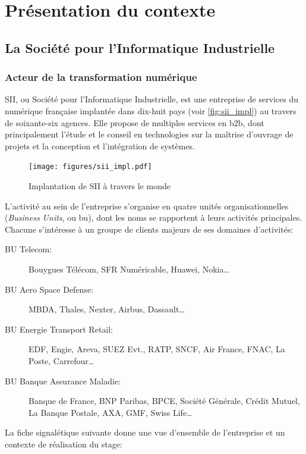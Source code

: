 \chapter{Présentation du contexte}
{
	\section{La Société pour l'Informatique Industrielle}
	{
		\subsection{Acteur de la transformation numérique}
		{
			\par
			{
				SII, ou Société pour l'Informatique Industrielle, est une entreprise de services du numérique française implantée dans dix-huit pays (voir \autoref{fig:sii_impl}) au travers de soixante-six agences. Elle propose de multiples services en \gls{b2b}, dont principalement l'étude et le conseil en technologies sur la maîtrise d'ouvrage de projets et la conception et l'intégration de systèmes.
			}
			
			\begin{figure}[h]
			{
				\centering
				\texttt{[image: figures/sii\_impl.pdf]}
				\caption{Implantation de SII à travers le monde\cite{sii_rf}}
				\label{fig:sii_impl}
			}
			\end{figure}
			
			\par
			{
				L'activité au sein de l'entreprise s'organise en quatre unités organisationnelles (\emph{Business Units}, ou \gls{bu}), dont les noms se rapportent à leurs activités principales. Chacune s'intéresse à un groupe de clients majeurs de ses domaines d'activités:
				\begin{description}
					\item[BU Telecom:] Bouygues Télécom, SFR Numéricable, Huawei, Nokia\dots
					\item[BU Aero Space Defense:] MBDA, Thales, Nexter, Airbus, Dassault\dots
					\item[BU Energie Transport Retail:] EDF, Engie, Areva, SUEZ Evt., RATP, SNCF, Air France, FNAC, La Poste, Carrefour\dots
					\item[BU Banque Assurance Maladie:] Banque de France, BNP Paribas, BPCE, Société Générale, Crédit Mutuel, La Banque Postale, AXA, GMF, Swiss Life\dots
				\end{description}
			}
			
			\par
			{
				La fiche signalétique suivante donne une vue d'ensemble de l'entreprise et un contexte de réalisation du stage:
			
}}}}
